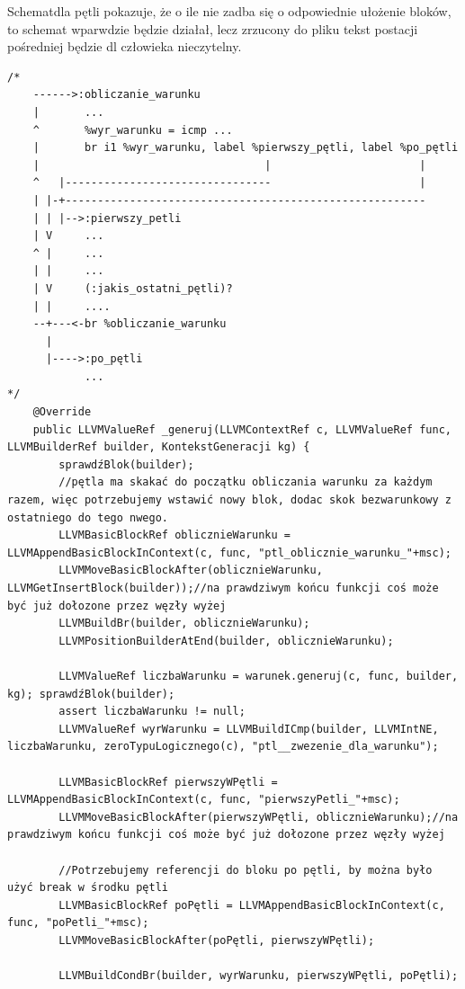 Schematdla pętli pokazuje, że o ile nie zadba się o odpowiednie ułożenie bloków, to schemat wparwdzie będzie działał, lecz zrzucony do pliku tekst postacji pośredniej będzie dl człowieka nieczytelny.
\lstset{
    escapechar=`,
    breaklines=true
}
\begin{lstlisting}[basicstyle=\scriptsize]
/*
    ------>:obliczanie_warunku
    |       ...
    ^       %wyr_warunku = icmp ...
    |       br i1 %wyr_warunku, label %pierwszy_pętli, label %po_pętli
    |                                   |                       |
    ^   |--------------------------------                       |
    | |-+--------------------------------------------------------
    | | |-->:pierwszy_petli
    | V     ...
    ^ |     ...
    | |     ...
    | V     (:jakis_ostatni_pętli)?
    | |     ....
    --+---<-br %obliczanie_warunku
      |
      |---->:po_pętli
            ...
*/
    @Override
    public LLVMValueRef _generuj(LLVMContextRef c, LLVMValueRef func, LLVMBuilderRef builder, KontekstGeneracji kg) {
        sprawdźBlok(builder);
        //pętla ma skakać do początku obliczania warunku za każdym razem, więc potrzebujemy wstawić nowy blok, dodac skok bezwarunkowy z ostatniego do tego nwego.
        LLVMBasicBlockRef oblicznieWarunku = LLVMAppendBasicBlockInContext(c, func, "ptl_oblicznie_warunku_"+msc);
        LLVMMoveBasicBlockAfter(oblicznieWarunku, LLVMGetInsertBlock(builder));//na prawdziwym końcu funkcji coś może być już dołozone przez węzły wyżej
        LLVMBuildBr(builder, oblicznieWarunku);
        LLVMPositionBuilderAtEnd(builder, oblicznieWarunku);

        LLVMValueRef liczbaWarunku = warunek.generuj(c, func, builder, kg); sprawdźBlok(builder);
        assert liczbaWarunku != null;
        LLVMValueRef wyrWarunku = LLVMBuildICmp(builder, LLVMIntNE, liczbaWarunku, zeroTypuLogicznego(c), "ptl__zwezenie_dla_warunku");

        LLVMBasicBlockRef pierwszyWPętli = LLVMAppendBasicBlockInContext(c, func, "pierwszyPetli_"+msc);
        LLVMMoveBasicBlockAfter(pierwszyWPętli, oblicznieWarunku);//na prawdziwym końcu funkcji coś może być już dołozone przez węzły wyżej

        //Potrzebujemy referencji do bloku po pętli, by można było użyć break w środku pętli
        LLVMBasicBlockRef poPętli = LLVMAppendBasicBlockInContext(c, func, "poPetli_"+msc);
        LLVMMoveBasicBlockAfter(poPętli, pierwszyWPętli);

        LLVMBuildCondBr(builder, wyrWarunku, pierwszyWPętli, poPętli);


\end{lstlisting}
